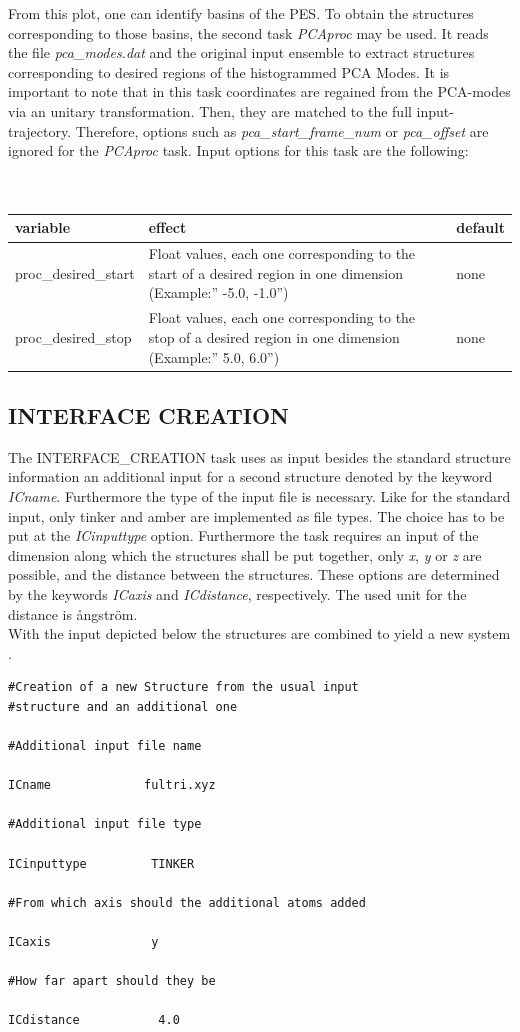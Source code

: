 \documentclass[10pt,a4paper]{article} %
\begin{document}
	From this plot, one can identify basins of the \acl{PES}. To obtain the structures corresponding to those basins, the second task \textit{PCAproc} may be used. It reads the file \textit{pca\_modes.dat} and the original input ensemble to extract structures corresponding to desired regions of the histogrammed \ac{PCA} Modes. It is important to note that in this task coordinates are regained from the PCA-modes via an unitary transformation. Then, they are matched to the full input-trajectory. Therefore, options such as \textit{pca\_start\_frame\_num} or \textit{pca\_offset} are ignored for the \textit{PCAproc} task. Input options for this task are the following:\\~\\~\\
	\begin{longtable}{|p{3.5cm}|p{5cm}|p{2.5cm}|}
		variable & effect & default\\
		\hline			
		proc\_desired\_start & Float values, each one corresponding to the start of a desired region in one dimension (Example:'' -5.0, -1.0'') & none\\
		proc\_desired\_stop & Float values, each one corresponding to the stop of a desired region in one dimension (Example:'' 5.0, 6.0'') & none\\
	\end{longtable}

	\subsection{INTERFACE CREATION}
	The INTERFACE\_CREATION task uses as input besides the standard structure information an additional input for a second structure denoted by the keyword \textit{ICname}. Furthermore the type of the input file is necessary. Like for the standard input, only tinker and amber are implemented as file types. The choice has to be put at the \textit{ICinputtype} option. Furthermore the task requires an input of the dimension along which the structures shall be put together, only \textit{x}, \textit{y} or \textit{z} are possible, and the distance between the structures. These options are determined by the keywords \textit{ICaxis} and \textit{ICdistance}, respectively. The used unit for the distance is \aa ngström.\\
With the input depicted below the structures are combined to yield a new system .

\begin{lstlisting}
#Creation of a new Structure from the usual input 
#structure and an additional one

#Additional input file name

ICname             fultri.xyz

#Additional input file type 

ICinputtype         TINKER

#From which axis should the additional atoms added 

ICaxis              y

#How far apart should they be 

ICdistance           4.0
\end{lstlisting}
\end{document}

